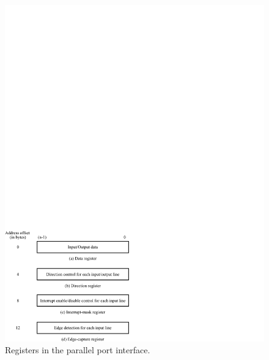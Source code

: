 \documentclass[epsfig,10pt,fullpage]{article}
\begin{document}
\begin{figure}[htb]
	\begin{center}
	\includegraphics[scale=1]{figures/figureparallel.pdf}
	\end{center}
	\caption{Registers in the parallel port interface.}
\label{fig:parallel}
\end{figure}
\end{document}
